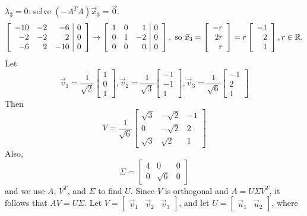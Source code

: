 \documentclass{ximera}
\begin{document}
\begin{example}
\begin{explanation}
$\lambda_3=0$: solve $(-A^TA)\vec{x}_3= \vec{0}$.
\[ \left[\begin{array}{rrr|r}
-10 & -2 & -6 & 0 \\ -2 & -2 & 2 & 0 \\ -6 & 2 & -10 & 0
\end{array}\right]
\rightarrow
\left[\begin{array}{rrr|r}
1 & 0 & 1 & 0 \\ 0 & 1 & -2 & 0 \\ 0 & 0 & 0 & 0
\end{array}\right],
\mbox{ so }
\vec{x}_3=\left[\begin{array}{r} -r \\ 2r \\ r \end{array}\right]
=r\left[\begin{array}{r} -1 \\ 2 \\ 1 \end{array}\right],
r\in \mathbb{R}. \]
Let
\[ \vec{v}_1=\frac{1}{\sqrt{2}}\left[\begin{array}{r} 1\\ 0\\ 1 \end{array}\right],
\vec{v}_2=\frac{1}{\sqrt{3}}\left[\begin{array}{r} -1\\ -1\\ 1 \end{array}\right],
\vec{v}_3=\frac{1}{\sqrt{6}}\left[\begin{array}{r} -1\\ 2\\ 1 \end{array}\right]\]
Then
\[ V=\frac{1}{\sqrt{6}}\left[\begin{array}{rrr}
\sqrt 3 & -\sqrt 2 & -1  \\
0 & -\sqrt 2 & 2 \\
\sqrt 3 & \sqrt 2 & 1 \end{array}\right]\]
Also,
\[ \Sigma = \left[\begin{array}{rrr} 4 & 0 & 0 \\
0 & \sqrt 6 & 0 \end{array}\right]\]
and we use $A$, $V^T$, and $\Sigma$ to find $U$. Since $V$ is orthogonal and $A=U\Sigma V^T$, it follows that $AV=U\Sigma$.
Let $V=\left[\begin{array}{ccc} \vec{v}_1 & \vec{v}_2 & \vec{v}_3 \end{array}\right]$, and
let $U=\left[\begin{array}{cc} \vec{u}_1 & \vec{u}_2 \end{array}\right]$, where

\end{explanation}
\end{example}
\end{document}
